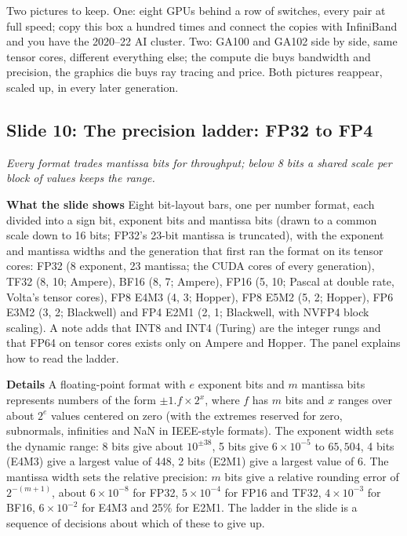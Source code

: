 \documentclass[11pt,letterpaper]{article}
\newcommand{\slide}[3]{%
  \subsection[Slide #1: #2]{Slide #1: #2}%
  {\color{muted}\itshape #3\par}\medskip}
\newcommand{\para}[1]{\medskip\noindent\textbf{#1}\quad}
\newenvironment{intuition}{\begin{tcolorbox}[intuitionbox]}{\end{tcolorbox}}
\begin{document}
\begin{intuition}
Two pictures to keep. One: eight GPUs behind a row of switches, every pair at full speed; copy this box a hundred times and connect the copies with InfiniBand and you have the 2020--22 AI cluster. Two: GA100 and GA102 side by side, same tensor cores, different everything else; the compute die buys bandwidth and precision, the graphics die buys ray tracing and price. Both pictures reappear, scaled up, in every later generation.
\end{intuition}

\slide{10}{The precision ladder: FP32 to FP4}{Every format trades mantissa bits for throughput; below 8 bits a shared scale per block of values keeps the range.}

\para{What the slide shows} Eight bit-layout bars, one per number format, each divided into a sign bit, exponent bits and mantissa bits (drawn to a common scale down to 16 bits; FP32's 23-bit mantissa is truncated), with the exponent and mantissa widths and the generation that first ran the format on its tensor cores: FP32 (8 exponent, 23 mantissa; the CUDA cores of every generation), TF32 (8, 10; Ampere), BF16 (8, 7; Ampere), FP16 (5, 10; Pascal at double rate, Volta's tensor cores), FP8 E4M3 (4, 3; Hopper), FP8 E5M2 (5, 2; Hopper), FP6 E3M2 (3, 2; Blackwell) and FP4 E2M1 (2, 1; Blackwell, with NVFP4 block scaling). A note adds that INT8 and INT4 (Turing) are the integer rungs and that FP64 on tensor cores exists only on Ampere and Hopper. The panel explains how to read the ladder.

\para{Details} A floating-point format with $e$ exponent bits and $m$ mantissa bits represents numbers of the form $\pm 1.f \times 2^{x}$, where $f$ has $m$ bits and $x$ ranges over about $2^{e}$ values centered on zero (with the extremes reserved for zero, subnormals, infinities and NaN in IEEE-style formats). The exponent width sets the dynamic range: 8 bits give about $10^{\pm 38}$, 5 bits give $6 \times 10^{-5}$ to $65{,}504$, 4 bits (E4M3) give a largest value of 448, 2 bits (E2M1) give a largest value of 6. The mantissa width sets the relative precision: $m$ bits give a relative rounding error of $2^{-(m+1)}$, about $6 \times 10^{-8}$ for FP32, $5 \times 10^{-4}$ for FP16 and TF32, $4 \times 10^{-3}$ for BF16, $6 \times 10^{-2}$ for E4M3 and 25\% for E2M1. The ladder in the slide is a sequence of decisions about which of these to give up.
\end{document}
